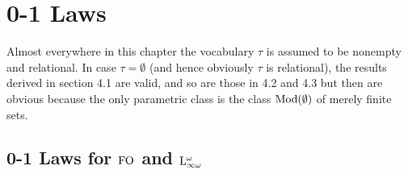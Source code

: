 \setcounter{chapter}{3}
\chapter{0-1 Laws}
Almost everywhere in this chapter the vocabulary $\tau$ is assumed to be nonempty and relational. In case $\tau = \emptyset$ (and hence obviously $\tau$ is relational), the results derived in section 4.1 are valid, and so are those in 4.2 and 4.3 but then are obvious because the only parametric class is the class $\mathrm{Mod}(\emptyset)$ of merely finite sets.
\setcounter{section}{0}
\section{0-1 Laws for $\folog$ and $\inflog[\omega]$}
